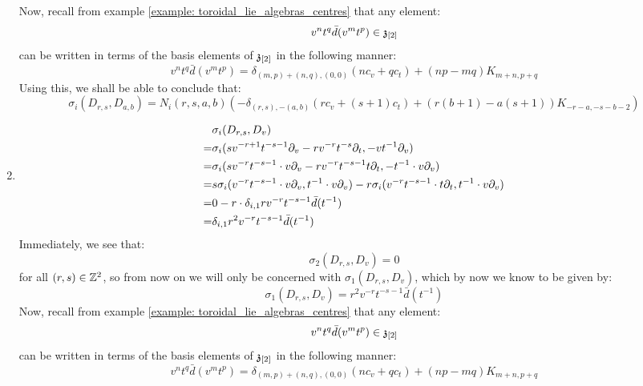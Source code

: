 \begin{example}
\begin{enumerate}
                Now, recall from example \ref{example: toroidal_lie_algebras_centres} that any element:
                    $$v^n t^q \bar{d}(v^m t^p) \in \mathfrak{z}_{[2]}$$
                can be written in terms of the basis elements of $\mathfrak{z}_{[2]}$ in the following manner:
                    $$v^n t^q \bar{d}(v^m t^p) = \delta_{(m, p) + (n, q), (0, 0)} ( n c_v + q c_t ) + (np - mq) K_{m + n, p + q}$$
                Using this, we shall be able to conclude that:
                    $$\sigma_i(D_{r, s}, D_{a, b}) = N_i(r, s, a, b) \left( -\delta_{(r, s), -(a, b)} (r c_v + (s + 1) c_t) + ( r(b + 1) - a(s + 1) )K_{-r - a, -s - b - 2} \right)$$
                \item
                    $$
                        \begin{aligned}
                            & \sigma_i(D_{r, s}, D_v)
                            \\
                            = & \sigma_i( s v^{-r + 1} t^{-s - 1} \partial_v - r v^{-r} t^{-s} \partial_t, -v t^{-1} \partial_v )
                            \\
                            = & \sigma_i( s v^{-r} t^{-s - 1} \cdot v \partial_v - r v^{-r} t^{-s - 1} t \partial_t, -t^{-1} \cdot v \partial_v )
                            \\
                            = & s \sigma_i( v^{-r} t^{-s - 1} \cdot v \partial_v, t^{-1} \cdot v \partial_v ) - r\sigma_i( v^{-r} t^{-s - 1} \cdot t \partial_t, t^{-1} \cdot v \partial_v )
                            \\
                            = & 0 - r \cdot \delta_{i, 1}r v^{-r} t^{-s - 1} \bar{d}(t^{-1})
                            \\
                            = & \delta_{i, 1} r^2 v^{-r} t^{-s - 1} \bar{d}(t^{-1})
                        \end{aligned}
                    $$
                Immediately, we see that:
                    $$\sigma_2(D_{r, s}, D_v) = 0$$
                for all $(r, s) \in \mathbb{Z}^2$, so from now on we will only be concerned with $\sigma_1(D_{r, s}, D_v)$, which by now we know to be given by:
                    $$\sigma_1(D_{r, s}, D_v) = r^2 v^{-r} t^{-s - 1} \bar{d}(t^{-1})$$
                Now, recall from example \ref{example: toroidal_lie_algebras_centres} that any element:
                    $$v^n t^q \bar{d}(v^m t^p) \in \mathfrak{z}_{[2]}$$
                can be written in terms of the basis elements of $\mathfrak{z}_{[2]}$ in the following manner:
                    $$v^n t^q \bar{d}(v^m t^p) = \delta_{(m, p) + (n, q), (0, 0)} ( n c_v + q c_t ) + (np - mq) K_{m + n, p + q}$$

\end{enumerate}
\end{example}
